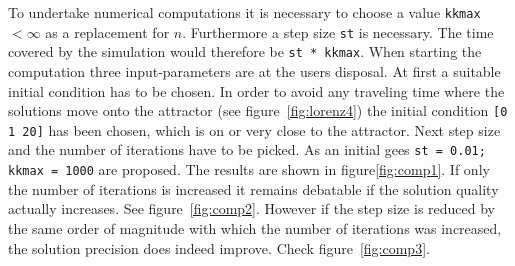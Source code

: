 To undertake numerical computations it is necessary to choose a value \texttt{kkmax} $< \infty$ as a replacement for $n$. Furthermore a step size \texttt{st} is necessary. The time covered by the simulation would therefore be \texttt{st * kkmax}. When starting the computation three input-parameters are at the users disposal. At first a suitable initial condition has to be chosen. In order to avoid any traveling time where the solutions move onto the attractor (see figure~\ref{fig:lorenz4}) the initial condition \texttt{[0 1 20]} has been chosen, which is on or very close to the attractor. Next step size and the number of iterations have to be picked. As an initial gees \texttt{st = 0.01; kkmax = 1000} are proposed. The results are shown in figure\ref{fig:comp1}. If only the number of iterations is increased it remains debatable if the solution quality actually increases. See figure~\ref{fig:comp2}. However if the step size is reduced by the same order of magnitude with which the number of iterations was increased, the solution precision does indeed improve. Check figure~\ref{fig:comp3}.

